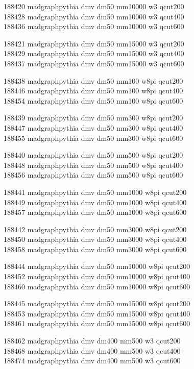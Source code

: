 188420 madgraphpythia  dmv dm50 mm10000 w3 qcut200\\
188428 madgraphpythia  dmv dm50 mm10000 w3 qcut400\\
188436 madgraphpythia  dmv dm50 mm10000 w3 qcut600

188421 madgraphpythia  dmv dm50 mm15000 w3 qcut200\\
188429 madgraphpythia  dmv dm50 mm15000 w3 qcut400\\
188437 madgraphpythia  dmv dm50 mm15000 w3 qcut600

188438 madgraphpythia  dmv dm50 mm100 w8pi qcut200\\
188446 madgraphpythia  dmv dm50 mm100 w8pi qcut400\\
188454 madgraphpythia  dmv dm50 mm100 w8pi qcut600

188439 madgraphpythia  dmv dm50 mm300 w8pi qcut200\\
188447 madgraphpythia  dmv dm50 mm300 w8pi qcut400\\
188455 madgraphpythia  dmv dm50 mm300 w8pi qcut600

188440 madgraphpythia  dmv dm50 mm500 w8pi qcut200\\
188448 madgraphpythia  dmv dm50 mm500 w8pi qcut400\\
188456 madgraphpythia  dmv dm50 mm500 w8pi qcut600

188441 madgraphpythia  dmv dm50 mm1000 w8pi qcut200\\
188449 madgraphpythia  dmv dm50 mm1000 w8pi qcut400\\
188457 madgraphpythia  dmv dm50 mm1000 w8pi qcut600

188442 madgraphpythia  dmv dm50 mm3000 w8pi qcut200\\
188450 madgraphpythia  dmv dm50 mm3000 w8pi qcut400\\
188458 madgraphpythia  dmv dm50 mm3000 w8pi qcut600

188444 madgraphpythia  dmv dm50 mm10000 w8pi qcut200\\
188452 madgraphpythia  dmv dm50 mm10000 w8pi qcut400\\
188460 madgraphpythia  dmv dm50 mm10000 w8pi qcut600

188445 madgraphpythia  dmv dm50 mm15000 w8pi qcut200\\
188453 madgraphpythia  dmv dm50 mm15000 w8pi qcut400\\
188461 madgraphpythia  dmv dm50 mm15000 w8pi qcut600

188462 madgraphpythia  dmv dm400 mm500 w3 qcut200\\
188468 madgraphpythia  dmv dm400 mm500 w3 qcut400\\
188474 madgraphpythia  dmv dm400 mm500 w3 qcut600

